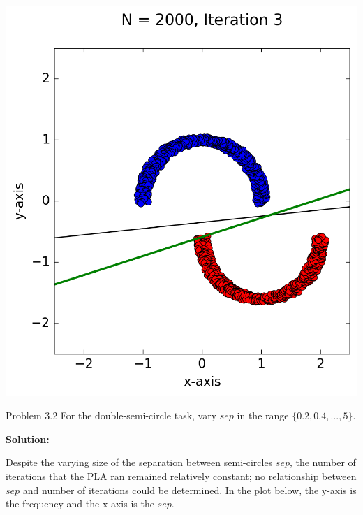 \documentclass[a4paper]{article}
\begin{document}
\begin {description}
\begin{doublespace}
\begin{enumerate}[(a)]
\begin{center}
\includegraphics[scale=0.65]{Problem_3_1_c.png}
\end{center}

\end{enumerate}
\end{doublespace}

\item{Problem 3.2} For the double-semi-circle task, vary $sep$ in the range $\{0.2,0.4,...,5\}$.

\smallskip

\textbf{Solution:}
\begin{doublespace}
Despite the varying size of the separation between semi-circles $sep$, the number of iterations that the PLA ran remained relatively constant; no relationship between $sep$ and number of iterations could be determined. In the plot below, the y-axis is the frequency and the x-axis is the $sep$. 


\end{doublespace}
\end{description}
\end{document}
